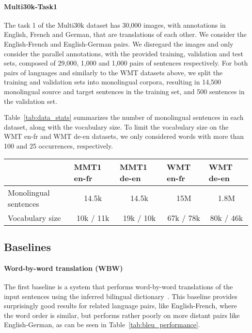 \paragraph{Multi30k-Task1} The task 1 of the Multi30k dataset \citep{elliott2016multi30k} has 30,000 images, with annotations in English, French and German, that are translations of each other. We consider the English-French and English-German pairs. We disregard the images and only consider the parallel annotations, with the provided training, validation and test sets, composed of 29,000, 1,000 and 1,000 pairs of sentences respectively. For both pairs of languages and similarly to the WMT datasets above, we split the training and validation sets into monolingual corpora, resulting in 14,500 monolingual source and target sentences in the training set, and 500 sentences in the validation set.

Table~\ref{tab:data_stats} summarizes the number of monolingual sentences in each dataset, along with the vocabulary size. To limit the vocabulary size on the WMT en-fr and WMT de-en datasets, we only considered words with more than 100 and 25 occurrences, respectively.


\begin{table*}[t]
    \begin{center}
    \centering
    \begin{tabular}{lllll}
    \toprule
    & MMT1 en-fr & MMT1 de-en & WMT en-fr & WMT de-en \\
    \midrule
    Monolingual sentences & \multicolumn{1}{c}{14.5k} & \multicolumn{1}{c}{14.5k} & \multicolumn{1}{c}{15M} & \multicolumn{1}{c}{1.8M} \\
    Vocabulary size & \multicolumn{1}{c}{10k / 11k} & \multicolumn{1}{c}{19k / 10k} &  \multicolumn{1}{c}{67k / 78k} &  \multicolumn{1}{c}{80k / 46k} \\
    \bottomrule
    \end{tabular}
	\caption{\textbf{Multi30k-Task1 and WMT datasets statistics.}
	To limit the vocabulary size in the WMT en-fr and WMT de-en datasets, we only considered words with more than 100 and 25 occurrences, respectively.}
	\label{tab:data_stats}
    \end{center}
\end{table*}


\subsection{Baselines}

\paragraph{Word-by-word translation (WBW)} The first baseline is a system that performs word-by-word translations of the input sentences using the inferred bilingual dictionary~\citep{wordalign17}. This baseline provides surprisingly good results for related language pairs, like English-French, where the word order is similar, but performs rather poorly on more distant pairs like English-German, as can be seen in Table~\ref{tab:bleu_performance}.

